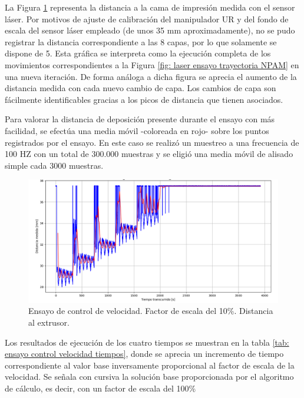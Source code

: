 La Figura \ref{fig:ensayo control velocidad laser 0.1} representa la distancia a la cama de impresión medida con el sensor láser. Por motivos de ajuste de calibración del manipulador UR y del fondo de escala del sensor láser empleado (de unos 35 mm aproximadamente), no se pudo registrar la distancia correspondiente a  las 8 capas, por lo que solamente se dispone de 5. Esta gráfica se interpreta como la ejecución completa de los movimientos correspondientes a la Figura \ref{fig: laser ensayo trayectoria NPAM} en una nueva iteración. De forma análoga a dicha figura se aprecia el aumento de la distancia medida con cada nuevo cambio de capa. Los cambios de capa son fácilmente identificables gracias a los picos de distancia que tienen asociados. 

Para valorar la distancia de deposición presente durante el ensayo  con más facilidad, se efectúa una media móvil -coloreada en rojo- sobre los puntos registrados por el ensayo. En este caso se realizó un muestreo a una frecuencia de 100 HZ con un total de 300.000 muestras y se eligió una media móvil de alisado simple cada 3000 muestras.

\begin{figure}[H]
    \centering
    \includegraphics[scale=0.30]{figuras/ensayo_control_velocidad/laser 0.1.png}
    \caption{Ensayo de control de velocidad. Factor de escala del 10\%. Distancia al extrusor.}
    \label{fig:ensayo control velocidad laser 0.1}
\end{figure}

Los resultados de ejecución de los cuatro tiempos se muestran en la tabla \ref{tab: ensayo control velocidad tiempos}, donde se aprecia un incremento de tiempo correspondiente al valor base inversamente proporcional al factor de escala de la velocidad. Se señala con cursiva la solución base proporcionada por el algoritmo de cálculo, es decir, con un factor de escala del 100\%

